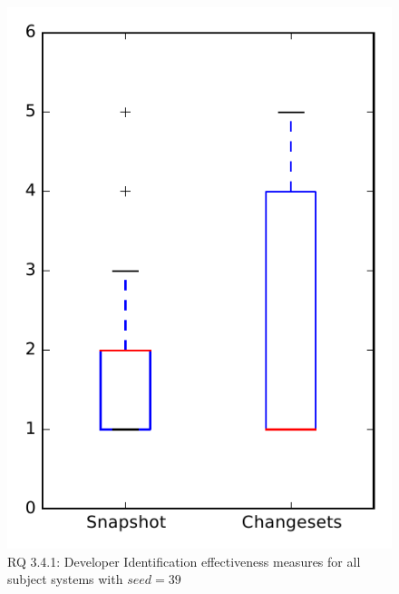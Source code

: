 
\begin{figure}
\centering
\includegraphics[height=0.4\textheight]{figures/dit_seed/rq1_overview_39}
\caption{RQ 3.4.1: Developer Identification effectiveness measures for all subject systems with $seed=39$}
\label{fig:dit_seed:rq1:overview}
\end{figure}
